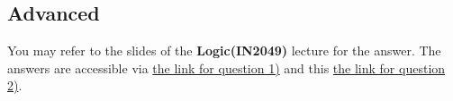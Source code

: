 \documentclass[12pt]{article}
\begin{document}
\subsection*{Advanced}
You may refer to the slides of the \textbf{Logic(IN2049)} lecture for the answer. The answers are accessible via 
\href{https://www21.in.tum.de/teaching/logic/SS22/assets/fol.pdf}{the link for question 1)} 
and this \href{https://www21.in.tum.de/teaching/logic/SS22/assets/normal-fol.pdf}{the link for question 2)}.
\end{document}
